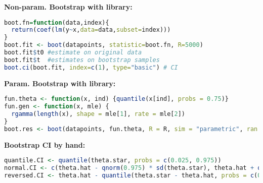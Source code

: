 \textbf{Non-param. Bootstrap with library: } 
\begin{lstlisting}[language=R]
boot.fn=function(data,index){
  return(coef(lm(y~x,data=data,subset=index)))
}
boot.fit <- boot(datapoints, statistic=boot.fn, R=5000)
boot.fit$t0 #estimate on original data
boot.fit$t  #estimates on bootstrap samples
boot.ci(boot.fit, index=c(1), type="basic") # CI
\end{lstlisting}
\textbf{Param. Bootstrap with library:} 
\begin{lstlisting}[language=R]
fun.theta <- function(x, ind) {quantile(x[ind], probs = 0.75)}
fun.gen <- function(x, mle) {
  rgamma(length(x), shape = mle[1], rate = mle[2])
}
boot.res <- boot(datapoints, fun.theta, R = R, sim = "parametric", ran.gen = fun.gen, mle = fit.gamma\$estimate)
\end{lstlisting}
\textbf{Bootstrap CI by hand:}
\begin{lstlisting}[language=R]
quantile.CI <- quantile(theta.star, probs = c(0.025, 0.975))
normal.CI <- c(theta.hat - qnorm(0.975) * sd(theta.star), theta.hat + qnorm(0.975) * sd(theta.star))
reversed.CI <- theta.hat - quantile(theta.star - theta.hat, probs = c(0.975, 0.025))
\end{lstlisting}